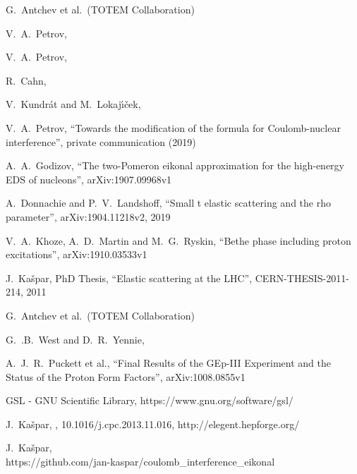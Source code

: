 \documentclass[pdftex,twocolumn,epjc3]{svjour3}
\begin{document}
\begin{thebibliography}{9}

	G.~Antchev et al.~(TOTEM Collaboration)

	V.~A.~Petrov,

	V.~A.~Petrov,

	R.~Cahn,

	V.~Kundr\'{a}t and M.~Lokaj\'{\i}\v{c}ek,

	V.~A.~Petrov,
	``Towards the modification of the formula for Coulomb-nuclear interference'',
	private communication (2019)

	A.~A.~Godizov,
	``The two-Pomeron eikonal approximation for the high-energy EDS of nucleons'',
	arXiv:1907.09968v1

	A.~Donnachie and  P.~V.~Landshoff,
	``Small t elastic scattering and the rho parameter'',
	arXiv:1904.11218v2,
	2019

	V.~A.~Khoze, A.~D.~Martin and M.~G.~Ryskin,
	``Bethe phase including proton excitations'',
	arXiv:1910.03533v1
	
	J.~Ka\v{s}par,
	PhD Thesis,
	``Elastic scattering at the LHC'',
	CERN-THESIS-2011-214,
	2011

	G.~Antchev et al.~(TOTEM Collaboration)

	G.~.B.~West and D.~R.~Yennie,

	A.~J.~R.~Puckett et al.,
	``Final Results of the GEp-III Experiment and the Status of the Proton Form Factors'',
	arXiv:1008.0855v1

	GSL - GNU Scientific Library,
	https://www.gnu.org/software/gsl/

	J.~Ka\v{s}par,
	,
	10.1016/j.cpc.2013.11.016,
	http://elegent.hepforge.org/

	J.~Ka\v{s}par,\\
	https://github.com/jan-kaspar/coulomb\_interference\_eikonal
	

\end{thebibliography}
\end{document}
